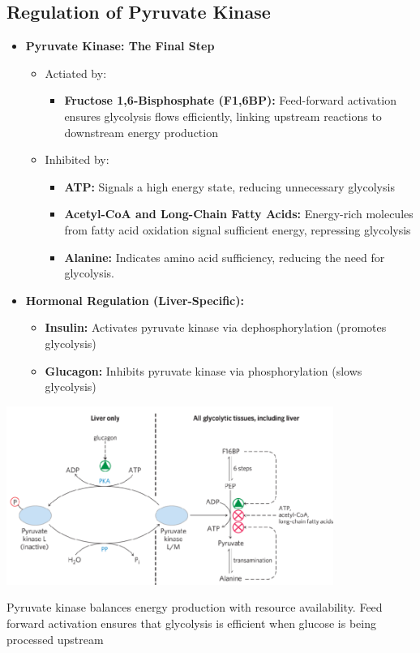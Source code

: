 \documentclass[10pt]{article}
\begin{document}
\subsection*{Regulation of Pyruvate Kinase}
\begin{itemize}
	\item \textbf{Pyruvate Kinase: The Final Step}
	\begin{itemize}
        \item Actiated by:
        \begin{itemize}
            \item \textbf{Fructose 1,6-Bisphosphate (F1,6BP):} Feed-forward activation ensures glycolysis flows efficiently, linking upstream reactions to downstream energy production
        \end{itemize}
        \item Inhibited by:
        \begin{itemize}
            \item \textbf{ATP:} Signals a high energy state, reducing unnecessary glycolysis
            \item \textbf{Acetyl-CoA and Long-Chain Fatty Acids:} Energy-rich molecules from fatty acid oxidation signal sufficient energy, repressing glycolysis
            \item \textbf{Alanine:} Indicates amino acid sufficiency, reducing the need for glycolysis.
        \end{itemize}
    \end{itemize}
	\item \textbf{Hormonal Regulation (Liver-Specific):} 
	\begin{itemize}
        \item \textbf{Insulin:} Activates pyruvate kinase via dephosphorylation (promotes glycolysis)
        \item \textbf{Glucagon:} Inhibits pyruvate kinase via phosphorylation (slows glycolysis)
    \end{itemize}
\end{itemize}
\begin{center} 
	\includegraphics*[width=0.8\textwidth]{L2_4.png}
\end{center}
Pyruvate kinase balances energy production with resource availability.  Feed forward activation ensures that glycolysis is efficient when glucose is being processed upstream
\end{document}
